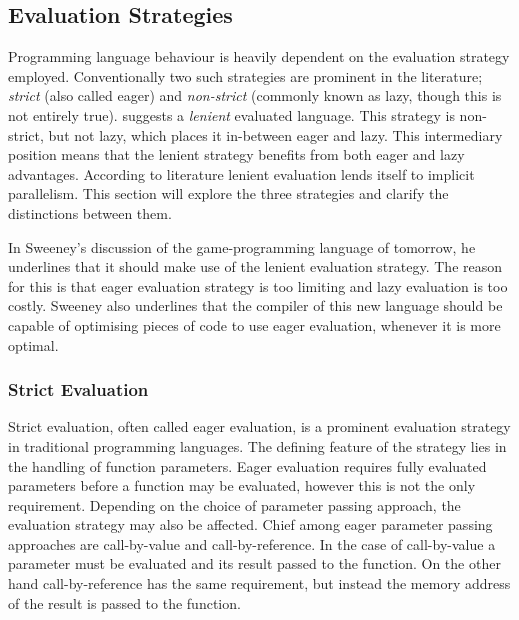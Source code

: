 \subsection{Evaluation Strategies}
Programming language behaviour is heavily dependent on the evaluation strategy employed. Conventionally two such strategies are prominent in the literature\cite{DBLP:journals/cl/Tremblay-lenient}; \textit{strict} (also called eager) and \textit{non-strict} (commonly known as lazy, though this is not entirely true). \cite{DBLP:journals/cl/Tremblay-lenient} suggests a \textit{lenient} evaluated language. This strategy is non-strict, but not lazy, which places it in-between eager and lazy\cite{DBLP:journals/cl/Tremblay-lenient}. This intermediary position means that the lenient strategy benefits from both eager and lazy advantages. According to literature lenient evaluation lends itself to implicit parallelism\cite{DBLP:journals/cl/Tremblay-parallel}. This section will explore the three strategies and clarify the distinctions between them.

In Sweeney's discussion of the game-programming language of tomorrow, he underlines that it should make use of the lenient evaluation strategy\cite{theNextMainstreanProgrammingLanguage}. The reason for this is that eager evaluation strategy is too limiting and lazy evaluation is too costly. Sweeney also underlines that the compiler of this new language should be capable of optimising pieces of code to use eager evaluation, whenever it is more optimal.

\subsubsection{Strict Evaluation}
Strict evaluation, often called eager evaluation, is a prominent evaluation strategy in traditional programming languages. The defining feature of the strategy lies in the handling of function parameters. Eager evaluation requires fully evaluated parameters before a function may be evaluated\cite[p.~103]{huttel2010transitions}, however this is not the only requirement. Depending on the choice of parameter passing approach, the evaluation strategy may also be affected. Chief among eager parameter passing approaches are call-by-value and call-by-reference. In the case of call-by-value a parameter must be evaluated and its result passed to the function. On the other hand call-by-reference has the same requirement, but instead the memory address of the result is passed to the function.

